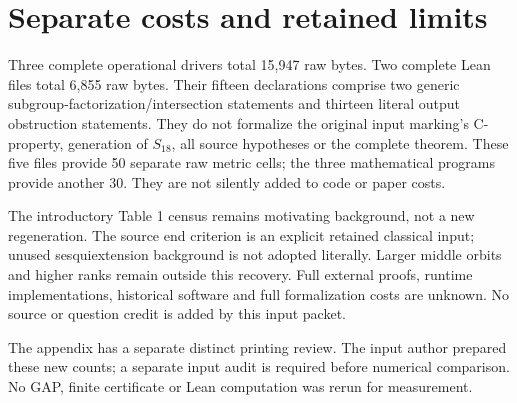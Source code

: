 \documentclass[a4paper,11pt]{article}
\begin{document}
\section*{Separate costs and retained limits}
Three complete operational drivers total 15,947 raw bytes. Two complete Lean
files total 6,855 raw bytes. Their fifteen declarations comprise two generic
subgroup-factorization/intersection statements and thirteen literal output
obstruction statements. They do not formalize the original input marking's
C-property, generation of $S_{18}$, all source hypotheses or the complete theorem.
These five files provide 50 separate raw metric cells; the three mathematical
programs provide another 30. They are not silently added to code or paper costs.

The introductory Table 1 census remains motivating background, not a new
regeneration. The source end criterion is an explicit retained classical input;
unused sesquiextension background is not adopted literally. Larger middle
orbits and higher ranks remain outside this recovery. Full external proofs,
runtime implementations, historical software and full formalization costs are
unknown. No source or question credit is added by this input packet.

The appendix has a separate distinct printing review. The input author prepared
these new counts; a separate input audit is required before numerical comparison.
No GAP, finite certificate or Lean computation was rerun for measurement.
\end{document}
